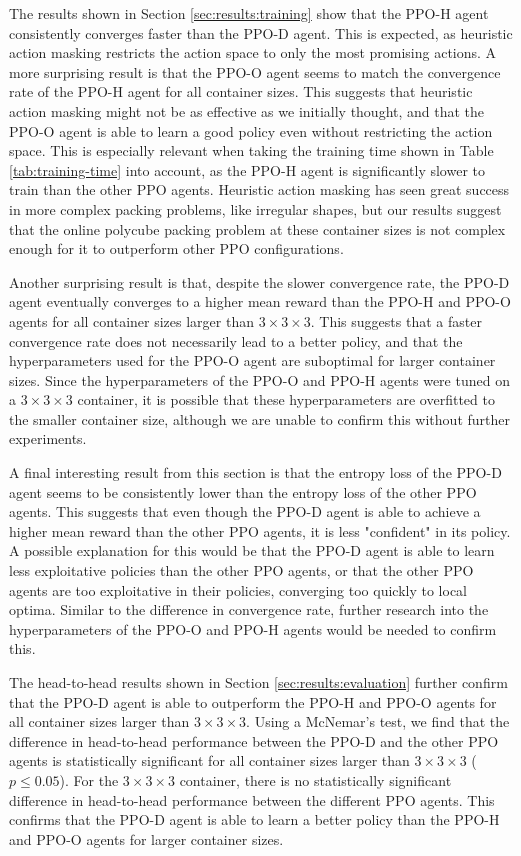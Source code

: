 \documentclass[conference]{IEEEtran}
\begin{document}
The results shown in Section \ref{sec:results:training} show that the PPO-H agent consistently converges faster than the PPO-D agent.
This is expected, as heuristic action masking restricts the action space to only the most promising actions.
A more surprising result is that the PPO-O agent seems to match the convergence rate of the PPO-H agent for all container sizes.
This suggests that heuristic action masking might not be as effective as we initially thought, and that the PPO-O agent is able to learn a good policy even without restricting the action space.
This is especially relevant when taking the training time shown in Table \ref{tab:training-time} into account, as the PPO-H agent is significantly slower to train than the other PPO agents.
Heuristic action masking has seen great success in more complex packing problems, like irregular shapes, but our results suggest that the online polycube packing problem at these container sizes is not complex enough for it to outperform other PPO configurations.

Another surprising result is that, despite the slower convergence rate, the PPO-D agent eventually converges to a higher mean reward than the PPO-H and PPO-O agents for all container sizes larger than $3 \times 3 \times 3$.
This suggests that a faster convergence rate does not necessarily lead to a better policy, and that the hyperparameters used for the PPO-O agent are suboptimal for larger container sizes.
Since the hyperparameters of the PPO-O and PPO-H agents were tuned on a $3 \times 3 \times 3$ container, it is possible that these hyperparameters are overfitted to the smaller container size, although we are unable to confirm this without further experiments.

A final interesting result from this section is that the entropy loss of the PPO-D agent seems to be consistently lower than the entropy loss of the other PPO agents.
This suggests that even though the PPO-D agent is able to achieve a higher mean reward than the other PPO agents, it is less "confident" in its policy.
A possible explanation for this would be that the PPO-D agent is able to learn less exploitative policies than the other PPO agents, or that the other PPO agents are too exploitative in their policies, converging too quickly to local optima.
Similar to the difference in convergence rate, further research into the hyperparameters of the PPO-O and PPO-H agents would be needed to confirm this.

The head-to-head results shown in Section \ref{sec:results:evaluation} further confirm that the PPO-D agent is able to outperform the PPO-H and PPO-O agents for all container sizes larger than $3 \times 3 \times 3$.
Using a McNemar's test, we find that the difference in head-to-head performance between the PPO-D and the other PPO agents is statistically significant for all container sizes larger than $3 \times 3 \times 3$ ($p \leq 0.05$).
For the $3 \times 3 \times 3$ container, there is no statistically significant difference in head-to-head performance between the different PPO agents.
This confirms that the PPO-D agent is able to learn a better policy than the PPO-H and PPO-O agents for larger container sizes.
\end{document}
